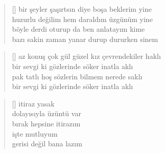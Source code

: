 \documentclass[10pt, openright, twoside]{memoir}
\theoremstyle{definition}
\begin{document}
\settowidth{\versewidth}{bir şeyler şaşırtsın diye boşa beklerim yine}
\begin{verse}[\versewidth]
  bir şeyler şaşırtsın diye boşa beklerim yine \\
  huzurlu değilim hem daraldım üzgünüm yine \\
  böyle derdi oturup da ben anlatayım kime \\
  bazı sakin zaman yanar durup dururken sinem \\
\end{verse}
\vspace*{\fill}
%
\newpage
{}
\vspace*{\fill}
\settowidth{\versewidth}{az konuş çok gül güzel kız çevrendekiler haklı}
\begin{verse}[\versewidth]
  az konuş çok gül güzel kız çevrendekiler haklı \\
  bir sevgi ki gözlerinde söker inatla aklı \\
  pak tatlı hoş sözlerin bilmem nerede saklı \\
  bir sevgi ki gözlerinde söker inatla aklı \\
\end{verse}
\vspace*{\fill}
%
\newpage
{}
\vspace*{\fill}
\settowidth{\versewidth}{gerisi değil bana lazım}
\begin{verse}[\versewidth]
  itiraz yasak \\
  dolayısıyla üzüntü var \\
  bırak hepsine itirazım \\
  işte mutluyum \\
  gerisi değil bana lazım \\
\end{verse}
\vspace*{\fill}
\let\clearpage\relax
\end{document}
